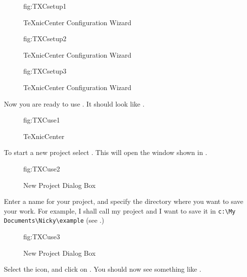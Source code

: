 \begin{figure}[hbtp]
  {\caption{TeXnicCenter Configuration Wizard}}
  {fig:TXCsetup1}
\end{figure}

\begin{figure}[hbtp]
  {\caption{TeXnicCenter Configuration Wizard}}
  {fig:TXCsetup2}
\end{figure}

\begin{figure}[hbtp]
  {\caption{TeXnicCenter Configuration Wizard}}
  {fig:TXCsetup3}
\end{figure}

Now you are ready to use .  It should look like
.

\begin{figure}[hbtp]
  {\caption{TeXnicCenter}}
  {fig:TXCuse1}
\end{figure}

\mbox{}\label{TXCnewproject}%
To start a new project select .
This will open the window shown in .

\begin{figure}[hbtp]
  {\caption{New Project Dialog Box}}
  {fig:TXCuse2}
\end{figure}

Enter a name for your project, and specify the directory where you
want to save your work.  For example, I shall call my project
 and I want to save it in 
\verb|c:\My Documents\Nicky\example| (see .)

\begin{figure}[hbtp]
  {\caption{New Project Dialog Box}}
  {fig:TXCuse3}
\end{figure}

Select the  icon, and click on .  You
should now see something like .


